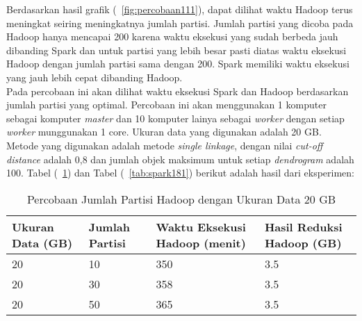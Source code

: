 Berdasarkan hasil grafik (~\ref{fig:percobaan111}), dapat dilihat waktu Hadoop terus meningkat seiring meningkatnya jumlah partisi. Jumlah partisi yang dicoba pada Hadoop hanya mencapai 200 karena waktu eksekusi yang sudah berbeda jauh dibanding Spark dan untuk partisi yang lebih besar pasti diatas waktu eksekusi Hadoop dengan jumlah partisi sama dengan 200. Spark memiliki waktu eksekusi yang jauh lebih cepat dibanding Hadoop. \\




Pada percobaan ini akan dilihat waktu eksekusi Spark dan Hadoop berdasarkan jumlah partisi yang optimal. Percobaan ini akan menggunakan 1 komputer sebagai komputer \textit{master} dan 10 komputer lainya sebagai \textit{worker} dengan setiap \textit{worker} munggunakan 1 core. Ukuran data yang digunakan adalah 20 GB. Metode yang digunakan adalah metode \textit{single linkage}, dengan nilai \textit{cut-off distance} adalah 0,8 dan jumlah objek maksimum untuk setiap \textit{dendrogram} adalah 100. Tabel (~\ref{tab:spark171}) dan Tabel (~\ref{tab:spark181}) berikut adalah hasil dari eksperimen:





\begin{table}[H] 
	\centering 
	\caption{Percobaan Jumlah Partisi Hadoop dengan Ukuran Data 20 GB}
	\label{tab:spark171}
	\begin{tabular}{|p{3cm}|p{3cm}|p{4cm}|p{4cm}|}
\hline
Ukuran Data (GB) & Jumlah Partisi &  Waktu Eksekusi Hadoop (menit) & Hasil Reduksi Hadoop (GB)\\
\hline
20 & 10 & 350  & 3.5  \\
\hline
20 & 30 & 358  & 3.5  \\
\hline
20 & 50 & 365  & 3.5  \\
\hline


\hline

	\end{tabular} 
\end{table}




